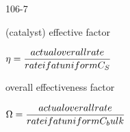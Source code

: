 \begin{mitframe}{106-7}
 \begin{listone}
 	\item (catalyst) effective factor 
    \item $\intrinsvisc=\dfrac{actual overall rate}{rate if at uniform \conc_{\entropy}}$
    \item overall effectiveness factor
    \item $\mpc=\dfrac{actual overall rate}{rate if at uniform \conc_bulk}$
 \end{listone}
\end{mitframe}